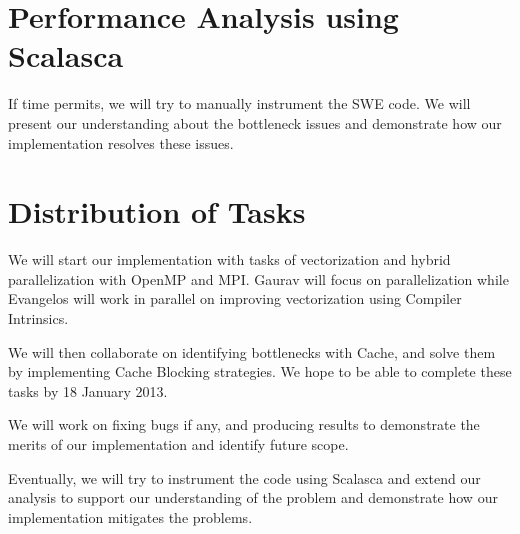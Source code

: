\documentclass[]{article}
\begin{document}
\section{Performance Analysis using Scalasca}
If time permits, we will try to manually instrument the SWE code. We will present our
understanding about the bottleneck issues and demonstrate how our implementation
resolves these issues.

\section{Distribution of Tasks}
We will start our implementation with tasks of vectorization and hybrid parallelization
with OpenMP and MPI. Gaurav will focus on parallelization while Evangelos will work in parallel
on improving vectorization using Compiler Intrinsics. 

We will then collaborate on identifying bottlenecks with Cache, and solve them by implementing
Cache Blocking strategies. We hope to be able to complete these tasks by 18 January 2013.

We will work on fixing bugs if any, and producing results to demonstrate the merits of our
implementation and identify future scope.

Eventually, we will try to instrument the code using Scalasca and extend our analysis to support
our understanding of the problem and demonstrate how our implementation mitigates the problems.
\end{document}
